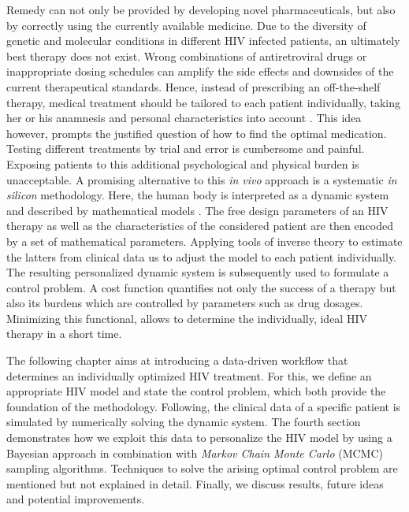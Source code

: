 Remedy can not only be provided by developing novel pharmaceuticals, but also by correctly using the currently available medicine.
Due to the diversity of genetic and molecular conditions in different HIV infected patients, an ultimately best therapy does 
not exist. 
Wrong combinations of antiretroviral drugs or inappropriate dosing schedules can amplify the side effects and downsides of the current 
therapeutical standards.
Hence, instead of prescribing an off-the-shelf therapy, medical treatment should be tailored to each patient individually, taking her or 
his anamnesis and personal characteristics into account \cite{lu2018haart}.\newline
This idea however, prompts the justified question of how to find the optimal medication.
Testing different treatments by trial and error is cumbersome and painful.
Exposing patients to this additional psychological and physical burden is unacceptable.\newline
A promising alternative to this \textit{in vivo} approach is a systematic \textit{in silicon} methodology.
Here, the human body is interpreted as a dynamic system and described by mathematical models \cite{rosenberg2007using}.
The free design parameters of an HIV therapy as well as the characteristics of the considered patient are then encoded by a set of mathematical 
parameters.
Applying tools of inverse theory to estimate the latters from clinical data us to adjust the model to each patient individually.
The resulting personalized dynamic system is subsequently used to formulate a control problem.
A cost function quantifies not only the success of a therapy but also its burdens which are controlled by parameters such as drug dosages.
Minimizing this functional, allows to determine the individually, ideal HIV therapy in a short time.\par

The following chapter aims at introducing a data-driven workflow that determines an individually optimized HIV treatment.
For this, we define an appropriate HIV model and state the control problem, which both provide the foundation of the methodology.
Following, the clinical data of a specific patient is simulated by numerically solving the dynamic system.
The fourth section demonstrates how we exploit this data to personalize the HIV model by using a Bayesian approach in combination with 
\textit{Markov Chain Monte Carlo} (MCMC) sampling algorithms.
Techniques to solve the arising optimal control problem are mentioned but not explained in detail.
Finally, we discuss results, future ideas and potential improvements.\newline